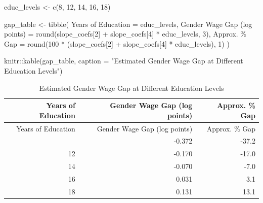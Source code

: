\documentclass[
  letterpaper,
  DIV=11,
  numbers=noendperiod]{scrreprt}
\newenvironment{Shaded}{\begin{snugshade}}{\end{snugshade}}
\newcommand{\AttributeTok}[1]{\textcolor[rgb]{0.40,0.45,0.13}{#1}}
\newcommand{\DecValTok}[1]{\textcolor[rgb]{0.68,0.00,0.00}{#1}}
\newcommand{\FunctionTok}[1]{\textcolor[rgb]{0.28,0.35,0.67}{#1}}
\newcommand{\NormalTok}[1]{\textcolor[rgb]{0.00,0.23,0.31}{#1}}
\newcommand{\OtherTok}[1]{\textcolor[rgb]{0.00,0.23,0.31}{#1}}
\newcommand{\SpecialCharTok}[1]{\textcolor[rgb]{0.37,0.37,0.37}{#1}}
\newcommand{\StringTok}[1]{\textcolor[rgb]{0.13,0.47,0.30}{#1}}
\begin{document}
\begin{Shaded}
\begin{Highlighting}[]
\NormalTok{educ\_levels }\OtherTok{\textless{}{-}} \FunctionTok{c}\NormalTok{(}\DecValTok{8}\NormalTok{, }\DecValTok{12}\NormalTok{, }\DecValTok{14}\NormalTok{, }\DecValTok{16}\NormalTok{, }\DecValTok{18}\NormalTok{)}

\NormalTok{gap\_table }\OtherTok{\textless{}{-}} \FunctionTok{tibble}\NormalTok{(}
    \StringTok{\textasciigrave{}}\AttributeTok{Years of Education}\StringTok{\textasciigrave{}} \OtherTok{=}\NormalTok{ educ\_levels,}
    \StringTok{\textasciigrave{}}\AttributeTok{Gender Wage Gap (log points)}\StringTok{\textasciigrave{}} \OtherTok{=} \FunctionTok{round}\NormalTok{(slope\_coefs[}\DecValTok{2}\NormalTok{] }\SpecialCharTok{+}\NormalTok{ slope\_coefs[}\DecValTok{4}\NormalTok{] }\SpecialCharTok{*}\NormalTok{ educ\_levels, }\DecValTok{3}\NormalTok{),}
    \StringTok{\textasciigrave{}}\AttributeTok{Approx. \% Gap}\StringTok{\textasciigrave{}} \OtherTok{=} \FunctionTok{round}\NormalTok{(}\DecValTok{100} \SpecialCharTok{*}\NormalTok{ (slope\_coefs[}\DecValTok{2}\NormalTok{] }\SpecialCharTok{+}\NormalTok{ slope\_coefs[}\DecValTok{4}\NormalTok{] }\SpecialCharTok{*}\NormalTok{ educ\_levels), }\DecValTok{1}\NormalTok{)}
\NormalTok{)}

\NormalTok{knitr}\SpecialCharTok{::}\FunctionTok{kable}\NormalTok{(gap\_table,}
             \AttributeTok{caption =} \StringTok{"Estimated Gender Wage Gap at Different Education Levels"}\NormalTok{)}
\end{Highlighting}
\end{Shaded}

\begin{longtable}[]{@{}rrr@{}}
\caption{Estimated Gender Wage Gap at Different Education
Levels}\tabularnewline
\toprule\noalign{}
Years of Education & Gender Wage Gap (log points) & Approx. \% Gap \\
\midrule\noalign{}
\endfirsthead
\toprule\noalign{}
Years of Education & Gender Wage Gap (log points) & Approx. \% Gap \\
\midrule\noalign{}
\endhead
\bottomrule\noalign{}
\endlastfoot
8 & -0.372 & -37.2 \\
12 & -0.170 & -17.0 \\
14 & -0.070 & -7.0 \\
16 & 0.031 & 3.1 \\
18 & 0.131 & 13.1 \\
\end{longtable}
\end{document}
